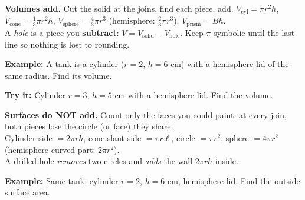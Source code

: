 \documentclass[12pt]{article}
\begin{document}


\begin{formulabox}
\textbf{Volumes add.} Cut the solid at the joins, find each piece, add.
$V_{\text{cyl}} = \pi r^2 h$, \quad $V_{\text{cone}} = \tfrac{1}{3}\pi r^2 h$, \quad
$V_{\text{sphere}} = \tfrac{4}{3}\pi r^3$ (hemisphere: $\tfrac{2}{3}\pi r^3$), \quad
$V_{\text{prism}} = Bh$.\\[3pt]
A \emph{hole} is a piece you \textbf{subtract}: $V = V_{\text{solid}} - V_{\text{hole}}$.
Keep $\pi$ symbolic until the last line so nothing is lost to rounding.
\end{formulabox}

\begin{examplebox}
\textbf{Example:} \quad A tank is a cylinder ($r = 2$, $h = 6$ cm) with a hemisphere lid of
the same radius. Find its volume.
\end{examplebox}

\begin{tryitbox}
\textbf{Try it:} \quad Cylinder $r = 3$, $h = 5$ cm with a hemisphere lid. Find the volume.\\[2pt]
\end{tryitbox}


\begin{formulabox}
\textbf{Surfaces do NOT add.} Count only the faces you could paint: at every join, both
pieces lose the circle (or face) they share.\\[3pt]
Cylinder side $= 2\pi r h$, \quad cone slant side $= \pi r \ell$, \quad circle $= \pi r^2$,
\quad sphere $= 4\pi r^2$ (hemisphere curved part: $2\pi r^2$).\\[3pt]
A drilled hole \emph{removes} two circles and \emph{adds} the wall $2\pi r h$ inside.
\end{formulabox}

\begin{examplebox}
\textbf{Example:} \quad Same tank: cylinder $r = 2$, $h = 6$ cm, hemisphere lid. Find the
outside surface area.
\end{examplebox}
\end{document}

